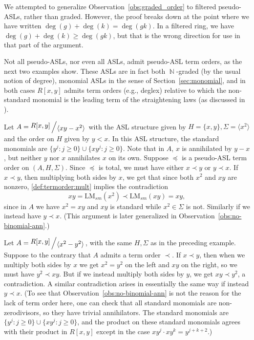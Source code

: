 \documentclass[11pt,reqno]{amsart}
\DeclareMathOperator{\N}{\mathbb{N}}
\newcommand{\bigslant}[2]{{\raisebox{.2em}{$#1$}\left/\raisebox{-.2em}{$#2$}\right.}}
\newcommand{\lmsm}{\text{LM}_{sm}}
\theoremstyle{definition}
\numberwithin{equation}{section}
\begin{document}
\begin{remark}
We attempted to generalize Observation~\ref{obs:graded_order} to filtered pseudo-ASLs, rather than graded. However, the proof breaks down at the point where we have written $\deg(g) + \deg(k) = \deg(gk)$. In a filtered ring, we have $\deg(g) + \deg(k) \geq \deg(gk)$, but that is the wrong direction for use in that part of the argument.
\end{remark}

Not all pseudo-ASLs, nor even all ASLs, admit pseudo-ASL term orders, as the next two examples show. These ASLs are in fact both $\N$-graded (by the usual notion of degree), monomial ASLs in the sense of Section~\ref{sec:monomial}, and in both cases $R[x,y]$ admits term orders (e.g., deglex) relative to which the non-standard monomial is the leading term of the straightening laws (as discussed in \cite{GrabePauer}).

\begin{example} \label{ex:no-term-order}
Let $A = \bigslant{R[x,y]}{\langle xy - x^2 \rangle}$ with the ASL structure given by $H = \{x,y\}, \Sigma = \langle x^2 \rangle$ and the order on $H$ given by $y < x$. In this ASL structure, the standard monomials are $\{y^j : j \geq 0\} \cup \{x y^j : j \geq 0\}$. Note that in $A$, $x$ is annihilated by $y-x$, but neither $y$ nor $x$ annihilates $x$ on its own. Suppose $\preceq$ is a pseudo-ASL term order on $(A, H, \Sigma)$. Since $\preceq$ is total, we must have either $x \prec y$ or $y \prec x$. If $x \prec y$, then multiplying both sides by $x$, we get that since both $x^2$ and $xy$ are nonzero, \ref{def:termorder:mult} implies the contradiction
\[
xy = \lmsm(x^2) \prec \lmsm(xy) = xy,
\]
since in $A$ we have $x^2 = xy$ and $xy$ is standard while $x^2 \in \Sigma$ is not. Similarly if we instead have $y \prec x$. (This argument is later generalized in Observation~\ref{obs:no-binomial-ann}.)
\end{example}

\begin{example} \label{ex:no-term-order-2}
Let $A = \bigslant{R[x,y]}{\langle x^2 - y^2 \rangle}$, with the same $H,\Sigma$ as in the preceding example. Suppose to the contrary that $A$ admits a term order $\prec$. If $x \prec y$, then when we multiply both sides by $x$ we get $x^2 = y^2$ on the left and $xy$ on the right, so we must have $y^2 \prec xy$. But if we instead multiply both sides by $y$, we get $xy \prec y^2$, a contradiction. A similar contradiction arises in essentially the same way if instead $y \prec x$. (To see that Observation~\ref{obs:no-binomial-ann} is not the reason for the lack of term order here, one can check that all standard monomials are non-zerodivisors, so they have trivial annihilators. The standard monomials are $\{y^j : j \geq 0\} \cup \{x y^j : j \geq 0\}$, and the product on these standard monomials agrees with their product in $R[x,y]$ except in the case $x y^j \cdot x y^k = y^{j+k+2}$.)
\end{example}
\end{document}
